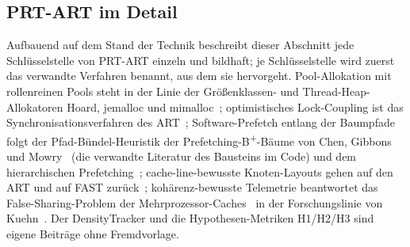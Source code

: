 \begin{nurlang}
\section{PRT-ART im Detail}\label{sec:prtart-impl}
Aufbauend auf dem Stand der Technik beschreibt dieser Abschnitt jede Schlüsselstelle von PRT-ART einzeln und
bildhaft; je Schlüsselstelle wird zuerst das verwandte Verfahren benannt, aus dem sie hervorgeht.
Pool-Allokation mit rollenreinen Pools steht in der Linie der Größenklassen- und Thread-Heap-Allokatoren
Hoard, jemalloc und mimalloc~\cite{berger2000hoard,evans2006jemalloc,leijen2019mimalloc}; optimistisches
Lock-Coupling ist das Synchronisationsverfahren des ART~\cite{leis2016olc}; Software-Prefetch entlang der
Baumpfade folgt der Pfad-Bündel-Heuristik der Prefetching-B\textsuperscript{+}-Bäume von Chen, Gibbons und
Mowry~\cite{chen2001prefetch} (die verwandte Literatur des Bausteins im Code) und dem hierarchischen
Prefetching~\cite{zhang2025hierarchical}; cache-line-bewusste
Knoten-Layouts gehen auf den ART und auf FAST zurück~\cite{leis2013art,kim2010fast}; kohärenz-bewusste
Telemetrie beantwortet das False-Sharing-Problem der Mehrprozessor-Caches~\cite{torrellas1994falsesharing}
in der Forschungslinie von Kuehn~\cite{kuehn2023bplustree}. Der DensityTracker und die Hypothesen-Metriken
H1/H2/H3 sind eigene Beiträge ohne Fremdvorlage.


\end{nurlang}
